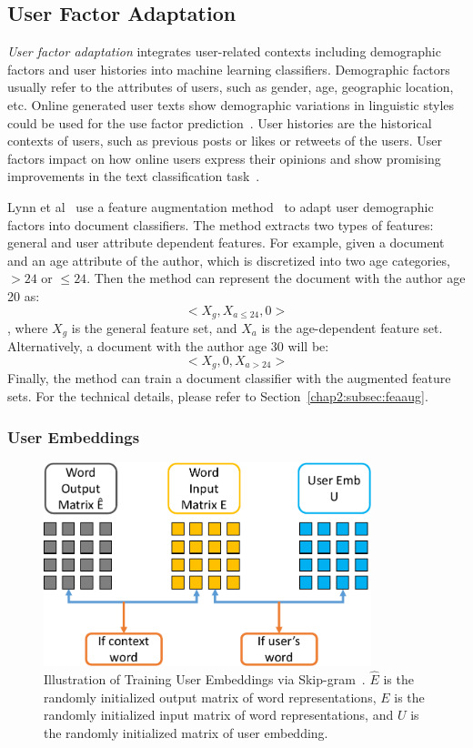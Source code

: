 \subsection{User Factor Adaptation}

\textit{User factor adaptation} integrates user-related contexts including demographic factors and user histories into machine learning classifiers. Demographic factors usually refer to the attributes of users, such as gender, age, geographic location, etc. Online generated user texts show demographic variations in linguistic styles could be used for the use factor prediction~\cite{rosenthal2011age, zhang2016predicting, hovy2018improving}. User histories are the historical contexts of users, such as previous posts or likes or retweets of the users. User factors impact on how online users express their opinions and show promising improvements in the text classification task~\cite{volkova2013exploring, hovy2015demographic, lynn2017human, yang2017overcoming}.

Lynn et al~\cite{lynn2017human} use a feature augmentation method~\cite{daume2007frustratingly} to adapt user demographic factors into document classifiers.
The method extracts two types of features: general and user attribute dependent features. 
For example, given a document and an age attribute of the author, which is discretized into two age categories, $> 24$ or $\leq 24$.
Then the method can represent the document with the author age 20 as:
$$<X_g, X_{a\leq24}, 0>$$
, where $X_g$ is the general feature set, and $X_a$ is the age-dependent feature set.
Alternatively, a document with the author age 30 will be:
$$<X_g, 0, X_{a>24}>$$
Finally, the method can train a document classifier with the augmented feature sets.
For the technical details, please refer to Section~\ref{chap2:subsec:feaaug}.


\subsubsection{User Embeddings}

\begin{figure}[tb!]
\centering
\includegraphics[width=0.85\textwidth]{images/chapter2/user-emb.pdf}
\caption{Illustration of Training User Embeddings via Skip-gram~\cite{amir2017quantifying}. $\hat{E}$ is the randomly initialized output matrix of word representations, $E$ is the randomly initialized input matrix of word representations, and $U$ is the randomly initialized matrix of user embedding.}
\label{chap2:fig:user}
\end{figure}

